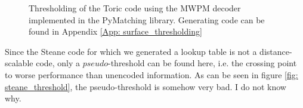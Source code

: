 \begin{figure}[h!]
    \centering
    \hfill
    \caption{Thresholding of the Toric code using the MWPM decoder implemented in the PyMatching \cite{MWPMDecoder} library.
    Generating code can be found in Appendix \ref{App: surface_thresholding}}
    \label{fig:toric_threshold}
\end{figure}
\newpage
Since the Steane code for which we generated a lookup table is not 
a distance-scalable code, only a $pseudo$-threshold can
be found here, i.e. the crossing point to worse performance than unencoded
information. As can be seen in figure \ref{fig: steane_threshold}, the
pseudo-threshold is somehow very bad. I do not know why.

